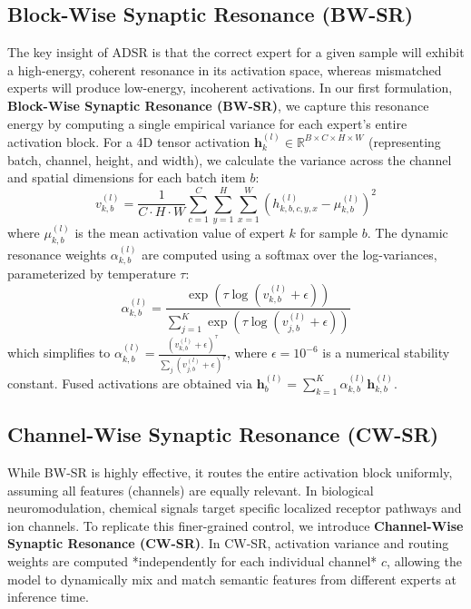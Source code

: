 \documentclass{article}
\theoremstyle{plain}
\theoremstyle{definition}
\theoremstyle{remark}
\begin{document}
\subsection{Block-Wise Synaptic Resonance (BW-SR)}
The key insight of ADSR is that the correct expert for a given sample will exhibit a high-energy, coherent resonance in its activation space, whereas mismatched experts will produce low-energy, incoherent activations. 
In our first formulation, \textbf{Block-Wise Synaptic Resonance (BW-SR)}, we capture this resonance energy by computing a single empirical variance for each expert's entire activation block. For a 4D tensor activation $\mathbf{h}_k^{(l)} \in \mathbb{R}^{B \times C \times H \times W}$ (representing batch, channel, height, and width), we calculate the variance across the channel and spatial dimensions for each batch item $b$:
\begin{equation}
    v_{k, b}^{(l)} = \frac{1}{C \cdot H \cdot W} \sum_{c=1}^C \sum_{y=1}^H \sum_{x=1}^W \left( h_{k, b, c, y, x}^{(l)} - \mu_{k, b}^{(l)} \right)^2
\label{eq:bw_var}
\end{equation}
where $\mu_{k, b}^{(l)}$ is the mean activation value of expert $k$ for sample $b$.
The dynamic resonance weights $\alpha_{k, b}^{(l)}$ are computed using a softmax over the log-variances, parameterized by temperature $\tau$:
\begin{equation}
    \alpha_{k, b}^{(l)} = \frac{\exp\left(\tau \log\left(v_{k, b}^{(l)} + \epsilon\right)\right)}{\sum_{j=1}^K \exp\left(\tau \log\left(v_{j, b}^{(l)} + \epsilon\right)\right)}
\label{eq:bw_softmax}
\end{equation}
which simplifies to $\alpha_{k, b}^{(l)} = \frac{(v_{k, b}^{(l)} + \epsilon)^\tau}{\sum_j (v_{j, b}^{(l)} + \epsilon)^\tau}$, where $\epsilon = 10^{-6}$ is a numerical stability constant. Fused activations are obtained via $\mathbf{h}_b^{(l)} = \sum_{k=1}^K \alpha_{k, b}^{(l)} \mathbf{h}_{k, b}^{(l)}$.

\subsection{Channel-Wise Synaptic Resonance (CW-SR)}
While BW-SR is highly effective, it routes the entire activation block uniformly, assuming all features (channels) are equally relevant. In biological neuromodulation, chemical signals target specific localized receptor pathways and ion channels. 
To replicate this finer-grained control, we introduce \textbf{Channel-Wise Synaptic Resonance (CW-SR)}. In CW-SR, activation variance and routing weights are computed *independently for each individual channel* $c$, allowing the model to dynamically mix and match semantic features from different experts at inference time.
\end{document}
